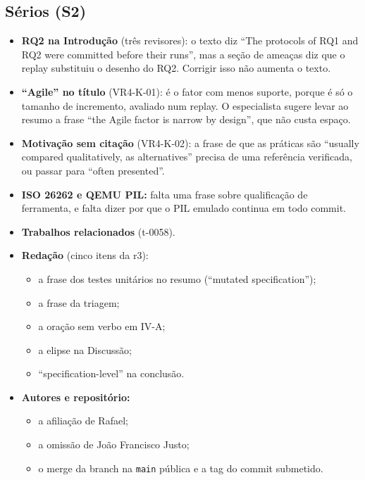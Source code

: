\documentclass[10pt,a4paper]{article}
\begin{document}
\subsection{Sérios (S2)}
\begin{itemize}
\item \textbf{RQ2 na Introdução} (três revisores): o texto diz ``The protocols of RQ1 and RQ2 were committed before their runs'', mas a seção de ameaças diz que o replay substituiu o desenho do RQ2. Corrigir isso não aumenta o texto.
\item \textbf{``Agile'' no título} (VR4-K-01): é o fator com menos suporte, porque é só o tamanho de incremento, avaliado num replay. O especialista sugere levar ao resumo a frase ``the Agile factor is narrow by design'', que não custa espaço.
\item \textbf{Motivação sem citação} (VR4-K-02): a frase de que as práticas são ``usually compared qualitatively, as alternatives'' precisa de uma referência verificada, ou passar para ``often presented''.
\item \textbf{ISO 26262 e QEMU PIL:} falta uma frase sobre qualificação de ferramenta, e falta dizer por que o PIL emulado continua em todo commit.
\item \textbf{Trabalhos relacionados} (t-0058).
\item \textbf{Redação} (cinco itens da r3):
  \begin{itemize}
  \item a frase dos testes unitários no resumo (``mutated specification'');
  \item a frase da triagem;
  \item a oração sem verbo em IV-A;
  \item a elipse na Discussão;
  \item ``specification-level'' na conclusão.
  \end{itemize}
\item \textbf{Autores e repositório:}
  \begin{itemize}
  \item a afiliação de Rafael;
  \item a omissão de João Francisco Justo;
  \item o merge da branch na \texttt{main} pública e a tag do commit submetido.
  \end{itemize}
\end{itemize}
\end{document}
